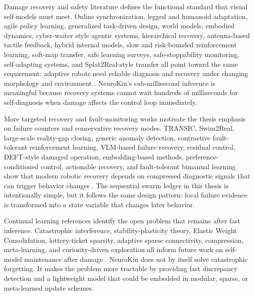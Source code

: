 \documentclass[12pt,a4paper,oneside]{report}
\begin{document}
Damage recovery and safety literature defines the functional standard that visual self-models must meet. Online synchronization, legged and humanoid adaptation, agile policy learning, generalized task-driven design, world models, embodied dynamics, cyber-waiter style agentic systems, hierarchical recovery, antenna-based tactile feedback, hybrid internal models, slow and risk-bounded reinforcement learning, soft-map transfer, safe learning surveys, safe-stoppability monitoring, self-adapting systems, and Splat2Real-style transfer all point toward the same requirement: adaptive robots need reliable diagnosis and recovery under changing morphology and environment \cite{niu2026synchronizedonline,miki2022anymal,miki2024legged,peng2026eagle,xing2025agile,yao2026generalized,yin2024geniesim,yin2025womap,rajeswaran2025embodiedynamics,ren2026cybowaiter,rigo2024hierarchical,xu2026antenna,xu2026dualhorizon,daneshmand2026slowrl,meng2026riskbounded,ma2025softmap,brunke2021safe,sun2026prism,domberg2026selfadapting,lim2025splat2real}. NeuroKin's sub-millisecond inference is meaningful because recovery systems cannot wait hundreds of milliseconds for self-diagnosis when damage affects the control loop immediately.

More targeted recovery and fault-monitoring works motivate the thesis emphasis on failure counters and conservative recovery modes. TRANSIC, Swim2Real, large-scale reality-gap closing, generic anomaly detection, contrastive fault-tolerant reinforcement learning, VLM-based failure recovery, residual control, DEFT-style damaged operation, embedding-based methods, preference-conditioned control, actionable recovery, and fault-tolerant bimanual learning show that modern robotic recovery depends on compressed diagnostic signals that can trigger behavior changes \cite{jiang2024transic,qiu2024swim2real,bytedance2025closing,grambow2026anomaly,fu2025contrastive,chen2024vlm,jayasinghe2026residual,briscoe2025deft,poddar2026embedding,li2026pchc,li2025dream2fix,lee2026tolebi}. The sequential swarm ledger in this thesis is intentionally simple, but it follows the same design pattern: local failure evidence is transformed into a state variable that changes later behavior.

Continual learning references identify the open problem that remains after fast inference. Catastrophic interference, stability-plasticity theory, Elastic Weight Consolidation, lottery-ticket sparsity, adaptive sparse connectivity, compression, meta-learning, and curiosity-driven exploration all inform future work on self-model maintenance after damage \cite{mccloskey1989catastrophic,french1999catastrophic,grossberg1987competitive,mermillod2013stability,kirkpatrick2017overcoming,frankle2018lottery,mocanu2018scalable,han2015deep,finn2017maml,pathak2017curiosity}. NeuroKin does not by itself solve catastrophic forgetting. It makes the problem more tractable by providing fast discrepancy detection and a lightweight model that could be embedded in modular, sparse, or meta-learned update schemes.
\end{document}
